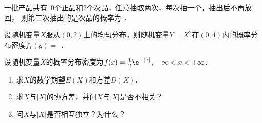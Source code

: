 \documentclass[plain,noanswer,medmath]{../../template/jnuexam}
\begin{document}


\begin{problem}
一批产品共有$10$个正品和$2$个次品，任意抽取两次，每次抽一个，抽出后不再放回，
则第二次抽出的是次品的概率为 \fillin{}．
\end{problem}


\begin{problem}
设随机变量$X$服从$(0,2)$上的均匀分布，则随机变量$Y = X^2$在$(0,4)$内的概率分布密度$f_Y(y) =$ \fillin{}．
\end{problem}



\begin{problem}
设随机变量$X$的概率分布密度为$f(x) = \frac{1}{2}\e^{- |x|}$, $-\infty < x < +\infty$．
\begin{enumerate}
\item 求$X$的数学期望$E(X)$和方差$D(X)$．
\item 求$X$与$|X|$的协方差，并问$X$与$|X|$是否不相关？
\item 问$X$与$|X|$是否相互独立？为什么？
\end{enumerate}
\end{problem}
\end{document}
